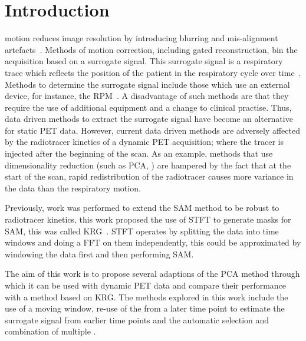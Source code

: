 \section{Introduction} \label{sec:introduction}
     motion reduces image resolution by introducing blurring and mis-alignment artefacts~\cite{Nehmeh2008a}. Methods of motion correction, including gated reconstruction, bin the acquisition based on a surrogate signal. This surrogate signal is a respiratory trace which reflects the position of the patient in the respiratory cycle over time~\cite{Kesner2010AMethods, Kesner2013GatingPET}. Methods to determine the surrogate signal include those which use an external device, for instance, the \gls{RPM}~\cite{Bettinardi2013Motion-trackingPET/CT}. A disadvantage of such methods are that they require the use of additional equipment and a change to clinical practise. Thus, data driven methods to extract the surrogate signal have become an alternative for static \acrshort{PET} data.
    However, current data driven methods are adversely affected by the radiotracer kinetics of a dynamic \acrshort{PET} acquisition; where the tracer is injected after the beginning of the scan. As an example, methods that use dimensionality reduction (such as \gls{PCA}, \cite{Thielemans2011, Bertolli2018Data-DrivenTomography}) are hampered by the fact that at the start of the scan, rapid redistribution of the radiotracer causes more variance in the data than the respiratory motion.
    
    Previously, work was performed to extend the \gls{SAM} method to be robust to radiotracer kinetics, this work proposed the use of \gls{STFT} to generate masks for \gls{SAM}, this was called \gls{KRG}~\cite{Schleyer2014}. \gls{STFT} operates by splitting the data into time windows and doing a \acrlong{FFT} on them independently, this could be approximated by windowing the data first and then performing \gls{SAM}.
    
    The aim of this work is to propose several adaptions of the \gls{PCA} method through which it can be used with dynamic \acrshort{PET} data and compare their performance with a method based on \gls{KRG}. The methods explored in this work include the use of a moving window, re-use of the  from a later time point to estimate the surrogate signal from earlier time points and the automatic selection and combination of multiple .

\vspace{-0.3cm}
    
